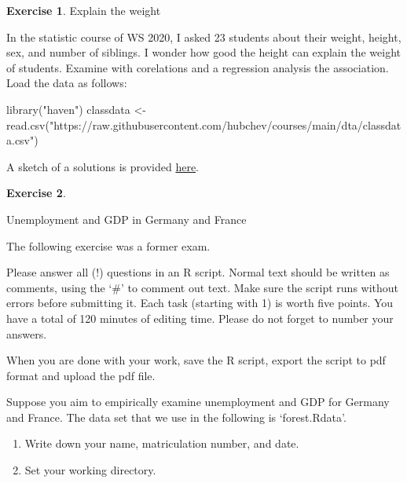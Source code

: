 \documentclass[
  12pt,
  oneside]{book}
\newenvironment{Shaded}{\begin{snugshade}}{\end{snugshade}}
\newcommand{\FunctionTok}[1]{\textcolor[rgb]{0.00,0.00,0.00}{#1}}
\newcommand{\NormalTok}[1]{#1}
\newcommand{\OtherTok}[1]{\textcolor[rgb]{0.56,0.35,0.01}{#1}}
\newcommand{\StringTok}[1]{\textcolor[rgb]{0.31,0.60,0.02}{#1}}
\theoremstyle{definition}
\theoremstyle{definition}
\theoremstyle{definition}
\newtheorem{exercise}{Exercise}[chapter]
\theoremstyle{definition}
\theoremstyle{remark}
\begin{document}
\begin{exercise}
\protect\hypertarget{exr:explainweight}{}\label{exr:explainweight}Explain the weight

In the statistic course of WS 2020, I asked 23 students about their weight, height, sex, and number of siblings. I wonder how good the height can explain the weight of students. Examine with corelations and a regression analysis the association. Load the data as follows:
\end{exercise}

\begin{Shaded}
\begin{Highlighting}[]
\FunctionTok{library}\NormalTok{(}\StringTok{"haven"}\NormalTok{)}
\NormalTok{classdata }\OtherTok{\textless{}{-}} \FunctionTok{read.csv}\NormalTok{(}\StringTok{"https://raw.githubusercontent.com/hubchev/courses/main/dta/classdata.csv"}\NormalTok{)}
\end{Highlighting}
\end{Shaded}

A sketch of a solutions is provided \href{https://raw.githubusercontent.com/hubchev/courses/main/scr/regress_lecture.R}{here}.

\begin{exercise}
\protect\hypertarget{exr:unemgerfra}{}\label{exr:unemgerfra}

Unemployment and GDP in Germany and France

The following exercise was a former exam.

Please answer all (!) questions in an R script. Normal text should be written as comments, using the `\#' to comment out text. Make sure the script runs without errors before submitting it. Each task (starting with 1) is worth five points. You have a total of 120 minutes of editing time. Please do not forget to number your answers.

When you are done with your work, save the R script, export the script to pdf format and upload the pdf file.

Suppose you aim to empirically examine unemployment and GDP for Germany and France. The data set that we use in the following is `forest.Rdata'.

\begin{enumerate}
\def\labelenumi{(\arabic{enumi})}
\setcounter{enumi}{-1}
\item
  Write down your name, matriculation number, and date.
\item
  Set your working directory.
\end{enumerate}

\end{exercise}
\end{document}
